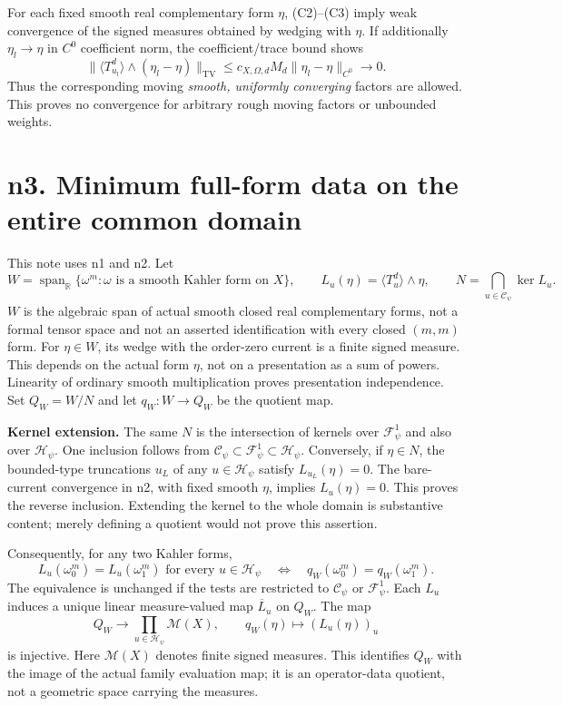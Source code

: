\documentclass[
  11pt,
]{article}
\begin{document}
For each fixed smooth real complementary form \(\eta\), (C2)--(C3) imply
weak convergence of the signed measures obtained by wedging with
\(\eta\). If additionally \(\eta_l\to\eta\) in \(C^0\) coefficient norm,
the coefficient/trace bound shows \[
\|\langle T_{u_l}^d\rangle\wedge(\eta_l-\eta)\|_{\mathrm{TV}}
\leq c_{X,\Omega,d}M_d\|\eta_l-\eta\|_{C^0}\longrightarrow0.
\] Thus the corresponding moving \emph{smooth, uniformly converging}
factors are allowed. This proves no convergence for arbitrary rough
moving factors or unbounded weights.

\section{n3. Minimum full-form data on the entire common
domain}\label{n3.-minimum-full-form-data-on-the-entire-common-domain}

This note uses n1 and n2. Let \[
W=\operatorname{span}_{\mathbb{R}}\{\omega^m:\omega\text{ is a smooth Kahler form on }X\},
\qquad L_u(\eta)=\langle T_u^d\rangle\wedge\eta,
\qquad N=\bigcap_{u\in\mathcal{C}_\psi}\ker L_u.
\] \(W\) is the algebraic span of actual smooth closed real
complementary forms, not a formal tensor space and not an asserted
identification with every closed \((m,m)\) form. For \(\eta\in W\), its
wedge with the order-zero current is a finite signed measure. This
depends on the actual form \(\eta\), not on a presentation as a sum of
powers. Linearity of ordinary smooth multiplication proves presentation
independence. Set \(Q_W=W/N\) and let \(q_W:W\to Q_W\) be the quotient
map.

\textbf{Kernel extension.} The same \(N\) is the intersection of kernels
over \(\mathcal{F}^1_\psi\) and also over \(\mathcal{H}_\psi\). One
inclusion follows from
\(\mathcal{C}_\psi\subset\mathcal{F}^1_\psi\subset\mathcal{H}_\psi\).
Conversely, if \(\eta\in N\), the bounded-type truncations \(u_L\) of
any \(u\in\mathcal{H}_\psi\) satisfy \(L_{u_L}(\eta)=0\). The
bare-current convergence in n2, with fixed smooth \(\eta\), implies
\(L_u(\eta)=0\). This proves the reverse inclusion. Extending the kernel
to the whole domain is substantive content; merely defining a quotient
would not prove this assertion.

Consequently, for any two Kahler forms, \[
L_u(\omega_0^m)=L_u(\omega_1^m)\text{ for every }u\in\mathcal{H}_\psi
\quad\Longleftrightarrow\quad
q_W(\omega_0^m)=q_W(\omega_1^m). \tag{Q1}
\] The equivalence is unchanged if the tests are restricted to
\(\mathcal{C}_\psi\) or \(\mathcal{F}^1_\psi\). Each \(L_u\) induces a
unique linear measure-valued map \(\overline L_u\) on \(Q_W\). The map
\[
Q_W\longrightarrow\prod_{u\in\mathcal{H}_\psi}\mathcal{M}(X),\qquad
q_W(\eta)\longmapsto(L_u(\eta))_u
\] is injective. Here \(\mathcal{M}(X)\) denotes finite signed measures.
This identifies \(Q_W\) with the image of the actual family evaluation
map; it is an operator-data quotient, not a geometric space carrying the
measures.
\end{document}
